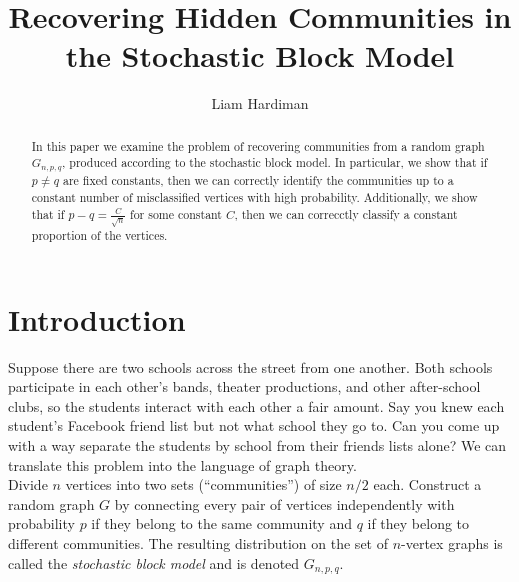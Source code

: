\documentclass[11pt,letterpaper]{report}
\date{}
\title{Recovering Hidden Communities in the Stochastic Block Model}
\author{Liam Hardiman}
\begin{document}
\maketitle


\begin{abstract}
In this paper we examine the problem of recovering communities from a random graph $G_{n,p,q}$, produced according to the stochastic block model. In particular, we show that if $p\neq q$ are fixed constants, then we can correctly identify the communities up to a constant number of misclassified vertices with high probability. Additionally, we show that if $p-q = \frac{C}{\sqrt{n}}$ for some constant $C$, then we can correcctly classify a constant proportion of the vertices.
\end{abstract}

\section{Introduction}
Suppose there are two schools across the street from one another. Both schools participate in each other's bands, theater productions, and other after-school clubs, so the students interact with each other a fair amount. Say you knew each student's Facebook friend list but not what school they go to. Can you come up with a way separate the students by school from their friends lists alone? We can translate this problem into the language of graph theory.\\


Divide $n$ vertices into two sets (``communities'') of size $n/2$ each. Construct a random graph $G$ by connecting every pair of vertices independently with probability $p$ if they belong to the same community and $q$ if they belong to different communities. The resulting distribution on the set of $n$-vertex graphs is called the \emph{stochastic block model} and is denoted $G_{n, p, q}$.\\
\end{document}
